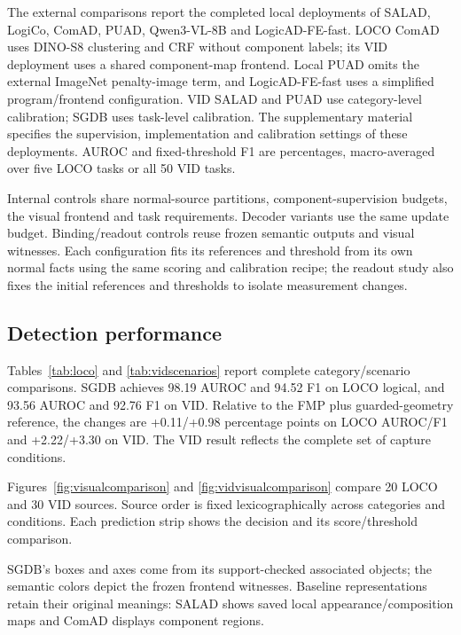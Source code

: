 The external comparisons report the completed local deployments of SALAD, LogiCo, ComAD, PUAD, Qwen3-VL-8B and LogicAD-FE-fast. LOCO ComAD uses DINO-S8 clustering and CRF without component labels; its VID deployment uses a shared component-map frontend. Local PUAD omits the external ImageNet penalty-image term, and LogicAD-FE-fast uses a simplified program/frontend configuration. VID SALAD and PUAD use category-level calibration; SGDB uses task-level calibration. The supplementary material specifies the supervision, implementation and calibration settings of these deployments. AUROC and fixed-threshold F1 are percentages, macro-averaged over five LOCO tasks or all 50 VID tasks.

Internal controls share normal-source partitions, component-supervision budgets, the visual frontend and task requirements. Decoder variants use the same update budget. Binding/readout controls reuse frozen semantic outputs and visual witnesses. Each configuration fits its references and threshold from its own normal facts using the same scoring and calibration recipe; the readout study also fixes the initial references and thresholds to isolate measurement changes.


\subsection{Detection performance}
Tables~\ref{tab:loco} and \ref{tab:vidscenarios} report complete category/scenario comparisons. SGDB achieves 98.19 AUROC and 94.52 F1 on LOCO logical, and 93.56 AUROC and 92.76 F1 on VID. Relative to the FMP plus guarded-geometry reference, the changes are +0.11/+0.98 percentage points on LOCO AUROC/F1 and +2.22/+3.30 on VID. The VID result reflects the complete set of capture conditions.



Figures~\ref{fig:visualcomparison} and \ref{fig:vidvisualcomparison} compare 20 LOCO and 30 VID sources. Source order is fixed lexicographically across categories and conditions. Each prediction strip shows the decision and its score/threshold comparison.



SGDB's boxes and axes come from its support-checked associated objects; the semantic colors depict the frozen frontend witnesses. Baseline representations retain their original meanings: SALAD shows saved local appearance/composition maps and ComAD displays component regions.





